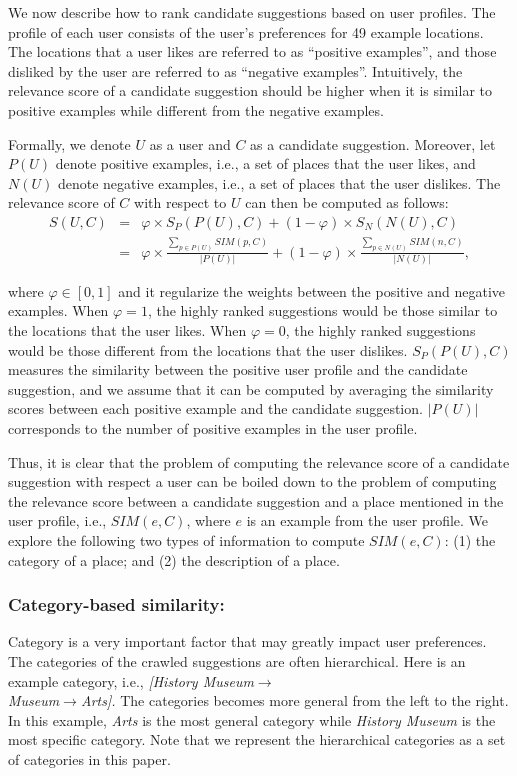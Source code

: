 We now describe how to rank candidate suggestions based on 
user profiles. The profile of each user consists of the user's 
preferences for 49 example locations. The locations that a 
user likes are referred to as ``positive examples'', and those
disliked by the user are referred to as ``negative examples''. 
Intuitively, the relevance score of a candidate suggestion should 
be higher when it is similar to positive examples while different
from the negative examples. 

Formally, we denote $U$ as a user and $C$ as a candidate suggestion. 
Moreover, let $P(U)$ denote positive examples, i.e., a set of places 
that the user likes, and $N(U)$ denote negative examples, i.e., a set 
of places that the user dislikes. The relevance score of $C$ with 
respect to $U$ can then be computed as follows:  
\begin{eqnarray}
    S(U,C) &=& \varphi \times S_P(P(U),C) + (1-\varphi) \times S_N(N(U),C) \\
&=& \varphi \times \frac{\sum_{p \in P(U)}{SIM(p,C)}}{|P(U)|} 
+ (1-\varphi) \times \frac{\sum_{p \in N(U)}{SIM(n,C)}}{|N(U)|}, 
\label{eq:13}
\end{eqnarray}

where $\varphi \in [0,1]$ and it regularize the weights between the 
positive and negative examples. When $\varphi=1$, the highly ranked 
suggestions would be those similar to the locations that the user likes. 
When $\varphi=0$, the highly ranked suggestions would be those 
different from the locations that the user dislikes. 
$S_P(P(U),C)$ measures the similarity between the positive user profile
and the candidate suggestion, and we assume that it can be computed 
by averaging the similarity scores between each positive example and 
the candidate suggestion. $|P(U)|$ corresponds to the number of 
positive examples in the user profile. 

Thus, it is clear that the problem of computing the relevance score 
of a candidate suggestion with respect a user can be boiled down 
to the problem of computing the relevance score between a candidate
suggestion and a place mentioned in the user profile, i.e., $SIM(e,C)$, 
where $e$ is an example from the user profile. We explore the following 
two types of information to compute $SIM(e,C)$: (1) the category 
of a place; and (2) the description of a place. 


\subsubsection{Category-based similarity:}
Category is a very important factor that may greatly
impact user preferences. The categories of the crawled 
suggestions are often hierarchical. Here is an example 
category, i.e.,  
\textit{[History Museum$\to$\\Museum$\to$Arts].}
The categories becomes more general from the left to the right. 
In this example, \textit{Arts} is the most general category
while \textit{History Museum} is the most specific category.
Note that we represent the hierarchical categories
as a set of categories in this paper. 


